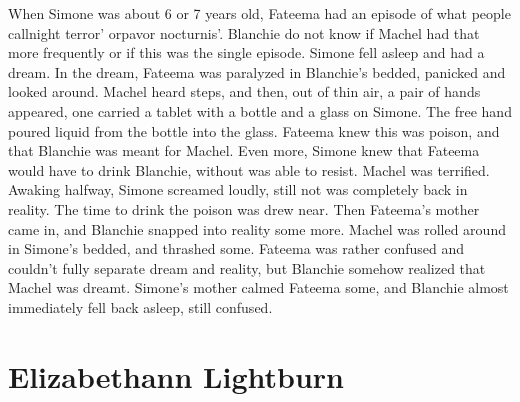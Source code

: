 \documentclass[12pt]{book}
\begin{document}
When Simone was about 6 or 7 years old, Fateema had an episode of what people callnight terror' orpavor nocturnis'. Blanchie do not know if Machel had that more frequently or if this was the single episode. Simone fell asleep and had a dream. In the dream, Fateema was paralyzed in Blanchie's bedded, panicked and looked around. Machel heard steps, and then, out of thin air, a pair of hands appeared, one carried a tablet with a bottle and a glass on Simone. The free hand poured liquid from the bottle into the glass. Fateema knew this was poison, and that Blanchie was meant for Machel. Even more, Simone knew that Fateema would have to drink Blanchie, without was able to resist. Machel was terrified. Awaking halfway, Simone screamed loudly, still not was completely back in reality. The time to drink the poison was drew near. Then Fateema's mother came in, and Blanchie snapped into reality some more. Machel was rolled around in Simone's bedded, and thrashed some. Fateema was rather confused and couldn't fully separate dream and reality, but Blanchie somehow realized that Machel was dreamt. Simone's mother calmed Fateema some, and Blanchie almost immediately fell back asleep, still confused.



\chapter{Elizabethann Lightburn}
\end{document}
